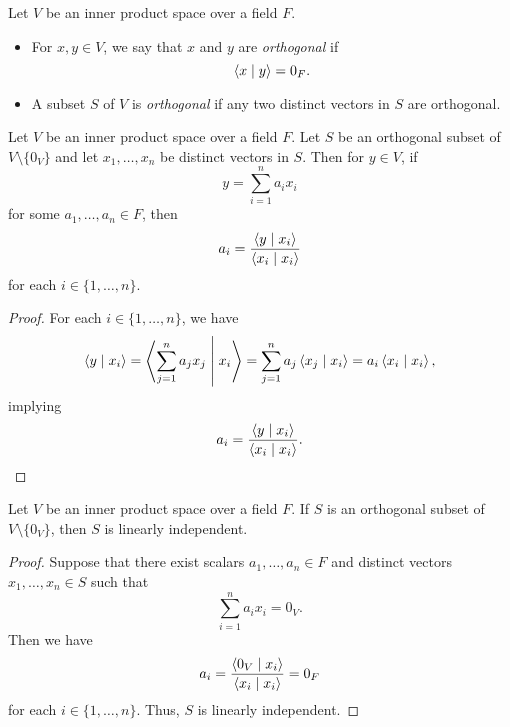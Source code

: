 \begin{definition}
  Let $V$ be an inner product space over a field $F$.
  \begin{itemize}
    \item For $x, y \in V$, we say that $x$ and $y$ are \emph{orthogonal} if
    \begin{equation*}
      \left\langle x \; \middle| \; y \right\rangle = 0_F.
    \end{equation*}
    \item A subset $S$ of $V$ is \emph{orthogonal} if any two distinct vectors
    in $S$ are orthogonal.
  \end{itemize}
\end{definition}

\begin{theorem}
  \label{thm:orthogonal-decomposition}
  Let $V$ be an inner product space over a field $F$.
  Let $S$ be an orthogonal subset of $V \setminus \{0_V\}$ and let
  $x_1, \dots, x_n$ be distinct vectors in $S$.
  Then for $y \in V$, if
  \begin{equation*}
    y = \sum_{i=1}^n a_ix_i
  \end{equation*}
  for some $a_1, \dots, a_n \in F$, then
  \begin{equation*}
    a_i = \frac{\left\langle y \; \middle| \; x_i \right\rangle}{\left\langle x_i \; \middle| \; x_i \right\rangle}
  \end{equation*}
  for each $i \in \{1, \dots, n\}$.
\end{theorem}
\begin{proof}
  For each $i \in \{1, \dots, n\}$, we have
  \begin{equation*}
    \left\langle y \; \middle| \; x_i \right\rangle
    = \left\langle \sum_{j=1}^n a_jx_j \; \middle| \; x_i \right\rangle
    = \sum_{j=1}^n a_j \left\langle x_j \; \middle| \; x_i \right\rangle
    = a_i \left\langle x_i \; \middle| \; x_i \right\rangle,
  \end{equation*}
  implying
  \begin{equation*}
    a_i = \frac{\left\langle y \; \middle| \; x_i \right\rangle}{\left\langle x_i \; \middle| \; x_i \right\rangle}.
    \qedhere
  \end{equation*}
\end{proof}

\begin{corollary}
  \label{thm:orthogonal-linearly-independent}
  Let $V$ be an inner product space over a field $F$.
  If $S$ is an orthogonal subset of $V \setminus \{0_V\}$, then $S$ is linearly
  independent.
\end{corollary}
\begin{proof}
  Suppose that there exist scalars $a_1, \dots, a_n \in F$ and distinct vectors
  $x_1, \dots, x_n \in S$ such that
  \begin{equation*}
    \sum_{i=1}^n a_ix_i = 0_V.
  \end{equation*}
  Then we have
  \begin{equation*}
    a_i = \frac{\left\langle 0_V \; \middle| \; x_i \right\rangle}{\left\langle x_i \; \middle| \; x_i \right\rangle} = 0_F
  \end{equation*}
  for each $i \in \{1, \dots, n\}$.
  Thus, $S$ is linearly independent.
\end{proof}

